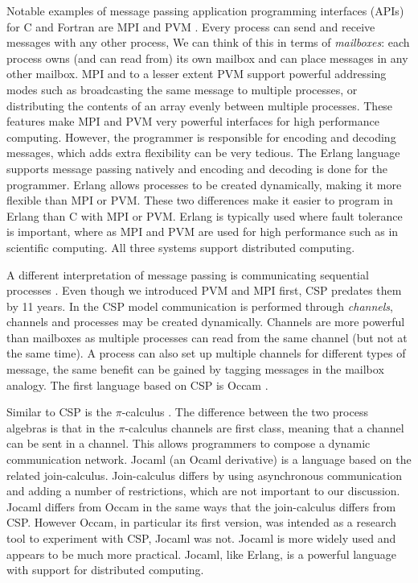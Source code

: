 Notable examples of message passing application programming interfaces (APIs)
for C and Fortran are MPI \citep{mpi} and PVM \citep{pvm}.
Every process can send and receive messages with any other process,
We can think of this in terms of \emph{mailboxes}:
each process owns (and can read from) its own mailbox and can place messages
in any other mailbox.
MPI and to a lesser extent PVM support powerful addressing modes
such as broadcasting the same message to multiple processes, or
distributing the contents of an array evenly between
multiple processes.
These features make MPI and PVM very powerful interfaces for high performance
computing.
However, the programmer is responsible for encoding and decoding messages,
which adds extra flexibility can be very tedious.
The Erlang language \citep{erlang} supports message passing natively and
encoding and decoding is done for the programmer.
Erlang allows processes to be created dynamically,
making it more flexible than MPI or PVM.
These two differences make it easier to program in Erlang than C with MPI or
PVM.
Erlang is typically used where fault tolerance is important,
where as MPI and PVM are used for high performance such as in scientific
computing.
All three systems support distributed computing.

A different interpretation of message passing is
communicating sequential processes \citep{hoare:1978:csp}.
Even though we introduced PVM and MPI first, CSP predates them by 11 years.
In the CSP model communication is performed through \emph{channels},
channels and processes may be created dynamically.
Channels are more powerful than mailboxes as multiple processes can read from
the same channel (but not at the same time).
A process can also set up multiple channels for different types of message,
the same benefit can be gained by tagging messages in the mailbox analogy.
The first language based on CSP is Occam \cite{occam}.

Similar to CSP is the $\pi$-calculus \cite{milner:pi}.
The difference between the two process algebras is that in the $\pi$-calculus
channels are first class, meaning that a channel can be sent in a channel.
This allows programmers to compose a dynamic communication network.
Jocaml \cite{jocaml} (an Ocaml \citep{ocaml} derivative) is a language based
on the related join-calculus.
Join-calculus differs by using asynchronous communication and adding a number
of restrictions, which are not important to our discussion.
Jocaml differs from Occam in the same ways that the join-calculus differs
from CSP.
However Occam, in particular its first version, was intended as a research
tool to experiment with CSP, Jocaml was not.
Jocaml is more widely used and appears to be much more practical.
Jocaml, like Erlang, is a powerful language with support for distributed
computing.

